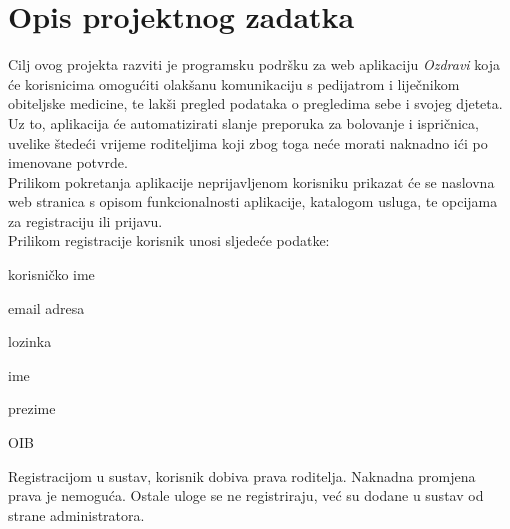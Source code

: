 \chapter{Opis projektnog zadatka}
		
		\text Cilj ovog projekta razviti je programsku podršku za web aplikaciju \textit{Ozdravi} koja će korisnicima omogućiti olakšanu komunikaciju s pedijatrom i liječnikom obiteljske medicine, te lakši pregled podataka o pregledima sebe i svojeg djeteta. Uz to, aplikacija će automatizirati slanje preporuka za bolovanje i ispričnica, uvelike štedeći vrijeme roditeljima koji zbog toga neće morati naknadno ići po imenovane potvrde.\\
		Prilikom pokretanja aplikacije neprijavljenom korisniku prikazat će se naslovna web stranica s opisom funkcionalnosti aplikacije, katalogom usluga, te opcijama za registraciju ili prijavu. \\
		Prilikom registracije korisnik unosi sljedeće podatke:
		\begin{packed_item}
			
			\item  korisničko ime
			\item  email adresa
			\item  lozinka
			\item  ime
			\item  prezime
			\item  OIB
		\end{packed_item}
		Registracijom u sustav, korisnik dobiva prava roditelja. Naknadna promjena prava je nemoguća. Ostale uloge se ne registriraju, već su dodane u sustav od strane administratora. 
		
